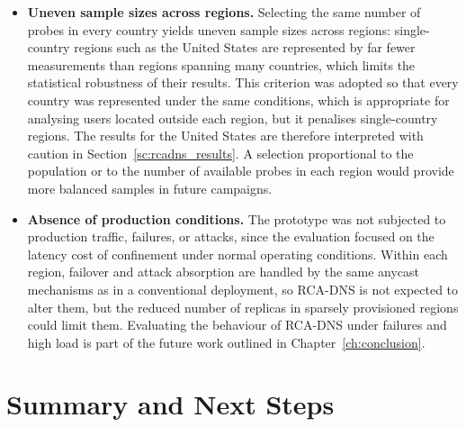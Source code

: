 \documentclass[
A4paper,                %
twoside,                %
openright,              %
chapterprefix=true,     %
12pt,                   %
headings=normal,        %
titlepage=on            %
]{book}
\begin{document}
\begin{itemize}
    \item \textbf{Uneven sample sizes across regions.} Selecting the same number of probes in every country yields uneven sample sizes across regions: single-country regions such as the United States are represented by far fewer measurements than regions spanning many countries, which limits the statistical robustness of their results. This criterion was adopted so that every country was represented under the same conditions, which is appropriate for analysing users located outside each region, but it penalises single-country regions. The results for the United States are therefore interpreted with caution in Section~\ref{sc:rcadns_results}. A selection proportional to the population or to the number of available probes in each region would provide more balanced samples in future campaigns.

    \item \textbf{Absence of production conditions.} The prototype was not subjected to production traffic, failures, or attacks, since the evaluation focused on the latency cost of confinement under normal operating conditions. Within each region, failover and attack absorption are handled by the same anycast mechanisms as in a conventional deployment, so RCA-DNS is not expected to alter them, but the reduced number of replicas in sparsely provisioned regions could limit them. Evaluating the behaviour of RCA-DNS under failures and high load is part of the future work outlined in Chapter~\ref{ch:conclusion}.
\end{itemize}

\section{Summary and Next Steps}
\label{sc:rcadns_summary}
\end{document}
